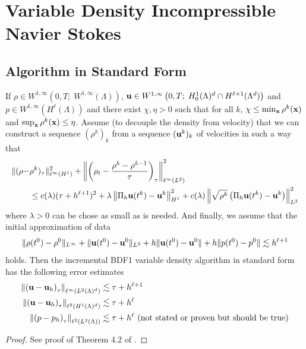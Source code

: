 \documentclass[letterpaper]{erdc}
\begin{document}
%
%
%
\section{Variable Density Incompressible Navier Stokes}

%
%
\subsection{Algorithm in Standard Form}

\begin{theorem}\label{thm:vardensityStandardFormBDF1}
  If $\rho \in W^{1,\infty}\left(0,T; \; W^{1,\infty}(\Lambda) \right)$,
  $\textbf{u} \in W^{1,\infty}\left(0,T;\; H^1_0(\Lambda)^d\cap H^{\ell+1}(\Lambda^d)
  \right)$
  and $p\in W^{1,\infty}\left( H^{\ell}(\Lambda)\right)$ and there exist
  $\chi, \eta >0 $ such that for all $k$, $\chi \leq \min_{\textbf{x}} \rho^k(\textbf{x})$ and
  $\sup_{\textbf{x}} \rho^k(\textbf{x}) \leq \eta$. Assume (to decouple the density from
  velocity) that we can construct a sequence $(\rho^k)_k$ from a sequence
  $(\textbf{u}^k)_k$ of velocities in such a way that
\begin{align}
  \|(\rho - &\rho^k)_{\tau}\|^2_{\ell^{\infty}(H^1)} + \left\| \left( \rho_t - \frac{\rho^k - \rho^{k-1}}{\tau} \right)_{\tau} \right\|^2_{\ell^{\infty}(L^2)}\\
  &\leq c(\lambda)(\tau + h^{\ell+1})^2 + \lambda \left\| \Pi_h\textbf{u}(t^k) - \textbf{u}^k  \right\|^2_{H^1} + c(\lambda)\left\|\sqrt{\rho^k} \left(\Pi_h\textbf{u}(t^k) - \textbf{u}^k\right)\right\|^2_{L^2}
  \end{align}
  where $\lambda>0$ can be chose as small as is needed. And finally, we assume that the initial approximation of data 
  \begin{equation}
    \|\rho(t^0) - \rho^0\|_{L^{\infty}} + \|\textbf{u}(t^0)-\textbf{u}^{0}\|_{L^2} + h\|\textbf{u}(t^0) - \textbf{u}^0\| + h\|p(t^0) - p^0\| \lesssim h^{\ell+1}
  \end{equation}
  holds.  Then the incremental BDF1 variable density algorithm in standard form has the following error estimates
  \begin{align}
    \left\|\left(\textbf{u} - \textbf{u}_h\right)_{\tau}\right\|_{\ell^{\infty}(L^2(\Lambda)^d)} &\lesssim \tau + h^{\ell+1}\\
    \left\|\left(\textbf{u} - \textbf{u}_h\right)_{\tau}\right\|_{\ell^{2}(H^1(\Lambda)^d)} &\lesssim \tau + h^{\ell}\\
    \left\|\left(p - p_h\right)_{\tau}\right\|_{\ell^{2}(L^2(\Lambda))} & \lesssim \tau + h^{\ell}  \mbox{  (not stated or proven but should be true)}
  \end{align}
\end{theorem}
\begin{proof}
  See proof of Theorem 4.2 of \cite{guermond2011error}.
\end{proof}
\end{document}
